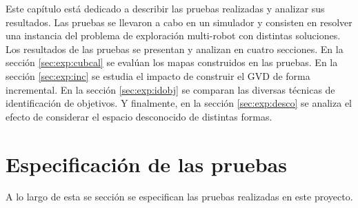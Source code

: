 






Este capítulo está dedicado a describir las pruebas realizadas y analizar sus 
resultados. Las pruebas se llevaron a cabo en un simulador y consisten
en resolver una instancia del problema de exploración multi-robot
con distintas soluciones.
Los resultados de las pruebas se presentan y analizan en cuatro secciones. En
la sección \ref{sec:exp:cubcal} se evalúan los mapas construidos en las
pruebas. En la sección \ref{sec:exp:inc} se estudia el impacto de construir el
GVD de forma incremental. En la sección \ref{sec:exp:idobj} se comparan las
diversas técnicas de identificación de objetivos. Y finalmente, en la sección
\ref{sec:exp:desco} se analiza el efecto de considerar el
espacio desconocido de distintas formas. 



\section{Especificación de las pruebas}

A lo largo de esta se sección se especifican las pruebas realizadas en este proyecto.

